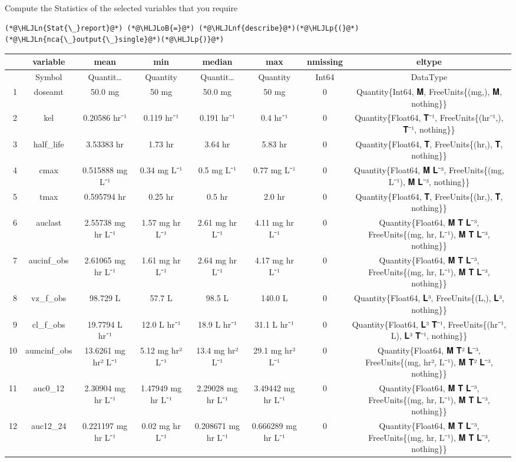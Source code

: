 \documentclass[12pt,a4paper]{article}
\newcommand{\HLJLn}[1]{#1}
\newcommand{\HLJLnf}[1]{\textcolor[RGB]{66,102,213}{#1}}
\newcommand{\HLJLoB}[1]{\textcolor[RGB]{102,102,102}{\textbf{#1}}}
\newcommand{\HLJLp}[1]{#1}
\begin{document}
Compute the Statistics of the selected variables that you require


\begin{lstlisting}
(*@\HLJLn{Stat{\_}report}@*) (*@\HLJLoB{=}@*) (*@\HLJLnf{describe}@*)(*@\HLJLp{(}@*)(*@\HLJLn{nca{\_}output{\_}single}@*)(*@\HLJLp{)}@*)
\end{lstlisting}


\begin{tabular}{r|ccccccc}
	& variable & mean & min & median & max & nmissing & eltype\\
	\hline
	& Symbol & Quantit… & Quantity & Quantit… & Quantity & Int64 & DataType\\
	\hline
	1 & doseamt & 50.0 mg & 50 mg & 50.0 mg & 50 mg & 0 & Quantity\{Int64, 𝐌, FreeUnits\{(mg,), 𝐌, nothing\}\} \\
	2 & kel & 0.20586 hr⁻¹ & 0.119 hr⁻¹ & 0.191 hr⁻¹ & 0.4 hr⁻¹ & 0 & Quantity\{Float64, 𝐓⁻¹, FreeUnits\{(hr⁻¹,), 𝐓⁻¹, nothing\}\} \\
	3 & half\_life & 3.53383 hr & 1.73 hr & 3.64 hr & 5.83 hr & 0 & Quantity\{Float64, 𝐓, FreeUnits\{(hr,), 𝐓, nothing\}\} \\
	4 & cmax & 0.515888 mg L⁻¹ & 0.34 mg L⁻¹ & 0.5 mg L⁻¹ & 0.77 mg L⁻¹ & 0 & Quantity\{Float64, 𝐌 𝐋⁻³, FreeUnits\{(mg, L⁻¹), 𝐌 𝐋⁻³, nothing\}\} \\
	5 & tmax & 0.595794 hr & 0.25 hr & 0.5 hr & 2.0 hr & 0 & Quantity\{Float64, 𝐓, FreeUnits\{(hr,), 𝐓, nothing\}\} \\
	6 & auclast & 2.55738 mg hr L⁻¹ & 1.57 mg hr L⁻¹ & 2.61 mg hr L⁻¹ & 4.11 mg hr L⁻¹ & 0 & Quantity\{Float64, 𝐌 𝐓 𝐋⁻³, FreeUnits\{(mg, hr, L⁻¹), 𝐌 𝐓 𝐋⁻³, nothing\}\} \\
	7 & aucinf\_obs & 2.61065 mg hr L⁻¹ & 1.61 mg hr L⁻¹ & 2.64 mg hr L⁻¹ & 4.17 mg hr L⁻¹ & 0 & Quantity\{Float64, 𝐌 𝐓 𝐋⁻³, FreeUnits\{(mg, hr, L⁻¹), 𝐌 𝐓 𝐋⁻³, nothing\}\} \\
	8 & vz\_f\_obs & 98.729 L & 57.7 L & 98.5 L & 140.0 L & 0 & Quantity\{Float64, 𝐋³, FreeUnits\{(L,), 𝐋³, nothing\}\} \\
	9 & cl\_f\_obs & 19.7794 L hr⁻¹ & 12.0 L hr⁻¹ & 18.9 L hr⁻¹ & 31.1 L hr⁻¹ & 0 & Quantity\{Float64, 𝐋³ 𝐓⁻¹, FreeUnits\{(hr⁻¹, L), 𝐋³ 𝐓⁻¹, nothing\}\} \\
	10 & aumcinf\_obs & 13.6261 mg hr² L⁻¹ & 5.12 mg hr² L⁻¹ & 13.4 mg hr² L⁻¹ & 29.1 mg hr² L⁻¹ & 0 & Quantity\{Float64, 𝐌 𝐓² 𝐋⁻³, FreeUnits\{(mg, hr², L⁻¹), 𝐌 𝐓² 𝐋⁻³, nothing\}\} \\
	11 & auc0\_12 & 2.30904 mg hr L⁻¹ & 1.47949 mg hr L⁻¹ & 2.29028 mg hr L⁻¹ & 3.49442 mg hr L⁻¹ & 0 & Quantity\{Float64, 𝐌 𝐓 𝐋⁻³, FreeUnits\{(mg, hr, L⁻¹), 𝐌 𝐓 𝐋⁻³, nothing\}\} \\
	12 & auc12\_24 & 0.221197 mg hr L⁻¹ & 0.02 mg hr L⁻¹ & 0.208671 mg hr L⁻¹ & 0.666289 mg hr L⁻¹ & 0 & Quantity\{Float64, 𝐌 𝐓 𝐋⁻³, FreeUnits\{(mg, hr, L⁻¹), 𝐌 𝐓 𝐋⁻³, nothing\}\} \\
\end{tabular}
\end{document}
